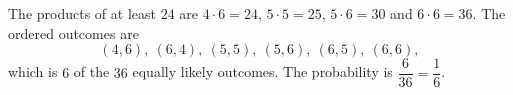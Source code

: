 The products of at least $24$ are $4\cdot6=24$, $5\cdot5=25$, $5\cdot6=30$ and $6\cdot6=36$. The ordered outcomes are
\[(4,6),\ (6,4),\ (5,5),\ (5,6),\ (6,5),\ (6,6),\]
which is $6$ of the $36$ equally likely outcomes. The probability is $\dfrac{6}{36}=\boxed{\dfrac16}$.
